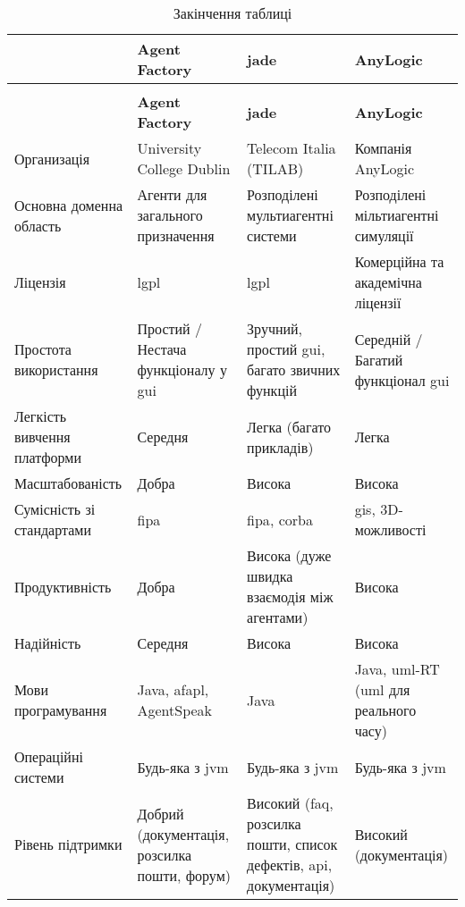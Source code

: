 {
	\small
	\tabulinesep=1.2mm
	\begin{longtabu} to \textwidth {|X[2,l]|X[2,l]|X[3,l]|X[3,l]|}
  		\caption{Порівняння платформ для розробки \acrshort{mas}~\cite{Kravari2015}}
  		\label{tab:mas_platform_comparsion} \\
		\hline
		& \textbf{Agent Factory} & \textbf{\acrshort{jade}} & \textbf{AnyLogic} \\\hline\endfirsthead
  		\caption*{Закінчення таблиці \thetable{}}\\
		\hline
		& \textbf{Agent Factory} & \textbf{\acrshort{jade}} & \textbf{AnyLogic} \\\hline\endhead
		Организація & University College Dublin & Telecom Italia (TILAB) & Компанія AnyLogic \\\hline
		Основна доменна область & Агенти для загального призначення & Розподілені мультиагентні системи & Розподілені мільтиагентні симуляції \\\hline
		Ліцензія & \acrshort{lgpl} & \acrshort{lgpl} & Комерційна та академічна ліцензії \\
		\hline
		Простота використання & Простий / Нестача функціоналу у \acrshort{gui} & Зручний, простий \acrshort{gui}, багато звичних функцій & Середній / Багатий функціонал \acrshort{gui} \\\hline
		Легкість вивчення платформи & Середня & Легка (багато прикладів) & Легка \\\hline
		Масштабованість & Добра & Висока & Висока \\\hline
		Сумісність зі стандартами & \acrshort{fipa} & \acrshort{fipa}, \acrshort{corba} & \acrshort{gis}, 3D-можливості \\
		\hline
		Продуктивність & Добра & Висока (дуже швидка взаємодія між агентами) & Висока \\\hline
		Надійність & Середня & Висока & Висока \\\hline
		Мови програмування & Java, \acrshort{afapl}, AgentSpeak & Java & Java, \acrshort{uml}-RT (\acrshort{uml} для реального часу) \\\hline
		Операційні системи & Будь-яка з \acrshort{jvm} & Будь-яка з \acrshort{jvm} & Будь-яка з \acrshort{jvm} \\
		\hline
		Рівень підтримки & Добрий (документація, розсилка пошти, форум) & Високий (\acrshort{faq}, розсилка пошти, список дефектів, \acrshort{api}, документація) & Високий (документація) \\\hline

\end{longtabu}}
